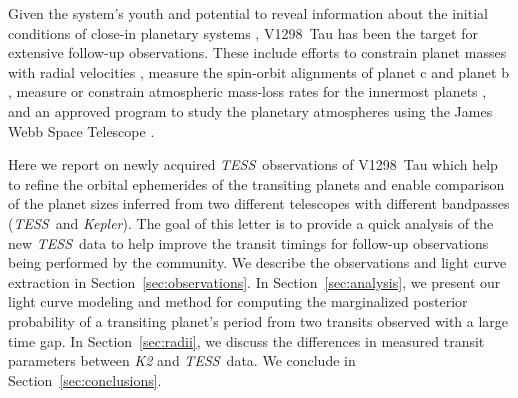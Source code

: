 \documentclass[twocolumn]{aastex631}
\newcommand{\tess}{\textit{TESS}}
\newcommand{\sname}{V1298~Tau\xspace}
\begin{document}
Given the system's youth and potential to reveal information about the initial conditions of close-in planetary systems \citep[e.g.][]{Owen2020,Poppenhaeger2021}, \sname has been the target for extensive follow-up observations. These include efforts to constrain planet masses with radial velocities \citep{Beichman2019,suarez21}, measure the spin-orbit alignments of planet c \citep{Feinstein21} and planet b \citep{johnson21, gaidos21}, measure or constrain atmospheric mass-loss rates for the innermost planets \citep{Schlawin21, Vissapragada21}, and an approved program to study the planetary atmospheres using the James Webb Space Telescope \citep[JWST;][]{Desert2021}.

Here we report on newly acquired \tess\ observations of \sname which help to refine the orbital ephemerides of the transiting planets and enable comparison of the planet sizes inferred from two different telescopes with different bandpasses (\tess\ and \textit{Kepler}). The goal of this letter is to provide a quick analysis of the new \tess\ data to help improve the transit timings for follow-up observations being performed by the community. We describe the observations and light curve extraction in Section~\ref{sec:observations}. In Section~\ref{sec:analysis}, we present our light curve modeling and method for computing the marginalized posterior probability of a transiting planet's period from two transits observed with a large time gap. In Section~\ref{sec:radii}, we discuss the differences in measured transit parameters between \textit{K2} and \tess\ data. We conclude in Section~\ref{sec:conclusions}.
\end{document}
